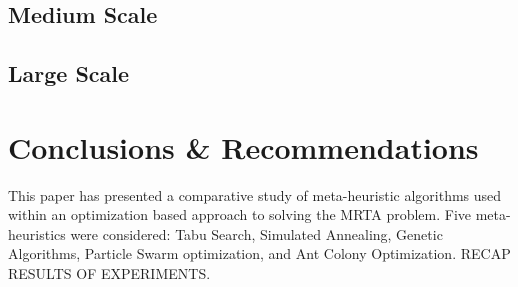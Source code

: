 \documentclass[a4paper]{article}
\begin{document}
\subsection{Medium Scale}

\subsection{Large Scale}

\section{Conclusions \& Recommendations}


This paper has presented a comparative study of meta-heuristic algorithms used within an optimization based approach to solving the MRTA problem. Five meta-heuristics were considered: Tabu Search, Simulated Annealing, Genetic Algorithms, Particle Swarm optimization, and Ant Colony Optimization. RECAP RESULTS OF EXPERIMENTS.

\printbibliography






\end{document}
